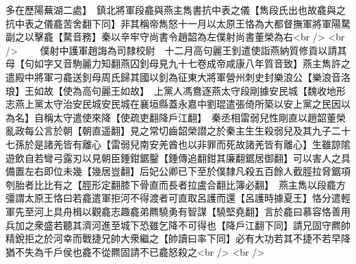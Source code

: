 多在歷陽蕪湖二處】　鎮北將軍段龕與燕主雋書抗中表之儀【雋段氏出也故龕與之抗中表之儀龕苦舍翻下同】非其稱帝雋怒十一月以太原王恪為大都督撫軍將軍陽騖副之以擊龕【騖音務】秦以辛牢守尚書令趙韶為左僕射尚書董榮為右<br />
<br />
　　僕射中護軍趙誨為司隸校尉　十二月高句麗王釗遣使詣燕納質修貢以請其母【句如字又音駒麗力知翻燕囚釗母見九十七卷成帝咸康八年質音致】燕主雋許之遣殿中將軍刁龕送釗母周氏歸其國以釗為征東大將軍營州刺史封樂浪公【樂浪音洛琅】王如故【使為高句麗王如故】　上黨人馮鴦逐燕太守段剛據安民城【魏收地形志燕上黨太守治安民城安民城在襄垣縣蓋永嘉中劉琨遣張倚所築以安上黨之民因以為名】自稱太守遣使來降【使疏吏翻降戶江翻】　秦丞相雷弱兒性剛直以趙韶董榮亂政每公言於朝【朝直遥翻】見之常切齒韶榮譛之於秦主生生殺弱兒及其九子二十七孫於是諸羌皆有離心【雷弱兒南安羌酋也以非罪而死故諸羌皆有離心】生雖諒隂遊飲自若彎弓露刃以見朝臣錘鉗鋸鑿【錘傳追翻鉗其廉翻鋸居御翻】可以害人之具備置左右即位未幾【幾居豈翻】后妃公卿已下至於僕隸凡殺五百餘人截脛拉脅鋸項刳胎者比比有之【脛形定翻膝下骨直而長者拉盧合翻比簿必翻】　燕主雋以段龕方彊謂太原王恪曰若龕遣軍拒河不得渡者可直取呂護而還【呂護時據夏王】恪分遣輕軍先至河上具舟楫以觀龕志趣龕弟羆驍勇有智謀【驍堅堯翻】言於龕曰慕容恪善用兵加之衆盛若聽其濟河進至城下恐雖乞降不可得也【降戶江翻下同】請兄固守羆帥精銳拒之於河幸而戰捷兄帥大衆繼之【帥讀曰率下同】必有大功若其不捷不若早降猶不失為千戶侯也龕不從羆固請不已龕怒殺之<br />
<br />
